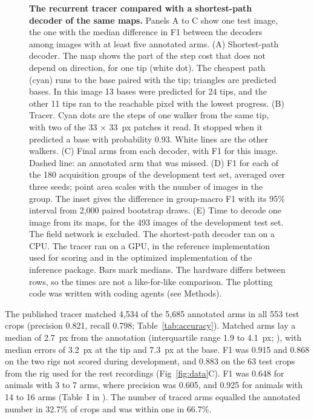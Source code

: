 \begin{figure}[!ht]
\caption{{\bf The recurrent tracer compared with a shortest-path decoder of the same maps.}
Panels A to C show one test image, the one with the median difference in F1 between the decoders among images with at least five annotated arms.
(A) Shortest-path decoder. The map shows the part of the step cost that does not depend on direction, for one tip (white dot). The cheapest path (cyan) runs to the base paired with the tip; triangles are predicted bases. In this image 13 bases were predicted for 24 tips, and the other 11 tips ran to the reachable pixel with the lowest progress.
(B) Tracer. Cyan dots are the steps of one walker from the same tip, with two of the 33 $\times$ 33~px patches it read. It stopped when it predicted a base with probability 0.93. White lines are the other walkers.
(C) Final arms from each decoder, with F1 for this image. Dashed line: an annotated arm that was missed.
(D) F1 for each of the 180 acquisition groups of the development test set, averaged over three seeds; point area scales with the number of images in the group. The inset gives the difference in group-macro F1 with its 95\% interval from 2,000 paired bootstrap draws.
(E) Time to decode one image from its maps, for the 493 images of the development test set. The field network is excluded. The shortest-path decoder ran on a CPU. The tracer ran on a GPU, in the reference implementation used for scoring and in the optimized implementation of the inference package. Bars mark medians. The hardware differs between rows, so the times are not a like-for-like comparison. The plotting code was written with coding agents (see Methods).}
\label{fig:decoders}
\end{figure}

The published tracer matched 4,534 of the 5,685 annotated arms in all 553 test crops (precision 0.821, recall 0.798; Table~\ref{tab:accuracy}).
Matched arms lay a median of 2.7~px from the annotation (interquartile range 1.9 to 4.1~px; ), with median errors of 3.2~px at the tip and 7.3~px at the base.
F1 was 0.915 and 0.868 on the two rigs not scored during development, and 0.883 on the 63 test crops from the rig used for the rest recordings (Fig~\ref{fig:data}C).
F1 was 0.648 for animals with 3 to 7 arms, where precision was 0.605, and 0.925 for animals with 14 to 16 arms (Table~I in ).
The number of traced arms equalled the annotated number in 32.7\% of crops and was within one in 66.7\%.

